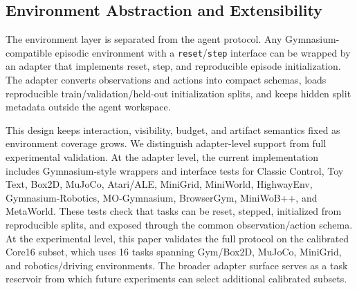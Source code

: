 \subsection{Environment Abstraction and Extensibility}
\label{sec:gym-compatible-envs}

The environment layer is separated from the agent protocol. Any
Gymnasium-compatible episodic environment with a \texttt{reset}/\texttt{step}
interface can be wrapped by an adapter that implements reset, step, and
reproducible episode initialization. The adapter converts observations and
actions into compact schemas, loads reproducible train/validation/held-out
initialization splits, and keeps hidden split metadata outside the agent
workspace.


This design keeps interaction, visibility, budget, and artifact semantics fixed
as environment coverage grows. We distinguish adapter-level support from full
experimental validation. At the adapter level, the current implementation
includes Gymnasium-style wrappers and interface tests for Classic Control, Toy
Text, Box2D, MuJoCo, Atari/ALE, MiniGrid, MiniWorld, HighwayEnv,
Gymnasium-Robotics, MO-Gymnasium, BrowserGym, MiniWoB++, and MetaWorld. These
tests check that tasks can be reset, stepped, initialized from reproducible
splits, and exposed through the common observation/action schema. At the
experimental level, this paper validates the full protocol on the calibrated
Core16 subset, which uses 16 tasks spanning Gym/Box2D, MuJoCo, MiniGrid, and
robotics/driving environments. The broader adapter surface serves as a task
reservoir from which future experiments can select additional calibrated
subsets.
